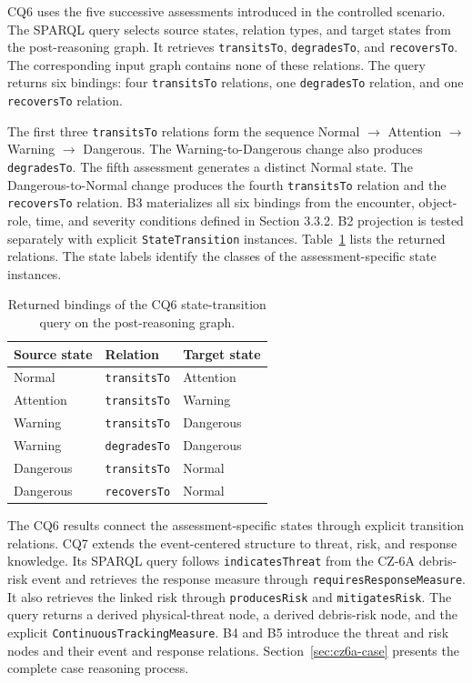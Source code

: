 \documentclass[Royal,sageh,times]{sagej}
\newcommand{\ont}[1]{{\urlstyle{tt}\nolinkurl{#1}}}
\begin{document}
CQ6 uses the five successive assessments introduced in the controlled scenario. The SPARQL query selects source states, relation types, and target states from the post-reasoning graph. It retrieves \ont{transitsTo}, \ont{degradesTo}, and \ont{recoversTo}. The corresponding input graph contains none of these relations. The query returns six bindings: four \ont{transitsTo} relations, one \ont{degradesTo} relation, and one \ont{recoversTo} relation.

The first three \ont{transitsTo} relations form the sequence Normal $\rightarrow$ Attention $\rightarrow$ Warning $\rightarrow$ Dangerous. The Warning-to-Dangerous change also produces \ont{degradesTo}. The fifth assessment generates a distinct Normal state. The Dangerous-to-Normal change produces the fourth \ont{transitsTo} relation and the \ont{recoversTo} relation. B3 materializes all six bindings from the encounter, object-role, time, and severity conditions defined in Section 3.3.2. B2 projection is tested separately with explicit \ont{StateTransition} instances. Table~\ref{tab:cq6-results} lists the returned relations. The state labels identify the classes of the assessment-specific state instances.

\begin{table}[!htbp]
  \centering
  \caption{Returned bindings of the CQ6 state-transition query on the post-reasoning graph.}
  \label{tab:cq6-results}
  \footnotesize
  \begin{tabular}{lll}
    \toprule
    \textbf{Source state} & \textbf{Relation} & \textbf{Target state} \\
    \midrule
    Normal & \ont{transitsTo} & Attention \\
    Attention & \ont{transitsTo} & Warning \\
    Warning & \ont{transitsTo} & Dangerous \\
    Warning & \ont{degradesTo} & Dangerous \\
    Dangerous & \ont{transitsTo} & Normal \\
    Dangerous & \ont{recoversTo} & Normal \\
    \bottomrule
  \end{tabular}
\end{table}
The CQ6 results connect the assessment-specific states through explicit transition relations. CQ7 extends the event-centered structure to threat, risk, and response knowledge. Its SPARQL query follows \ont{indicatesThreat} from the CZ-6A debris-risk event and retrieves the response measure through \ont{requiresResponseMeasure}. It also retrieves the linked risk through \ont{producesRisk} and \ont{mitigatesRisk}. The query returns a derived physical-threat node, a derived debris-risk node, and the explicit \ont{ContinuousTrackingMeasure}. B4 and B5 introduce the threat and risk nodes and their event and response relations. Section~\ref{sec:cz6a-case} presents the complete case reasoning process.
\end{document}
